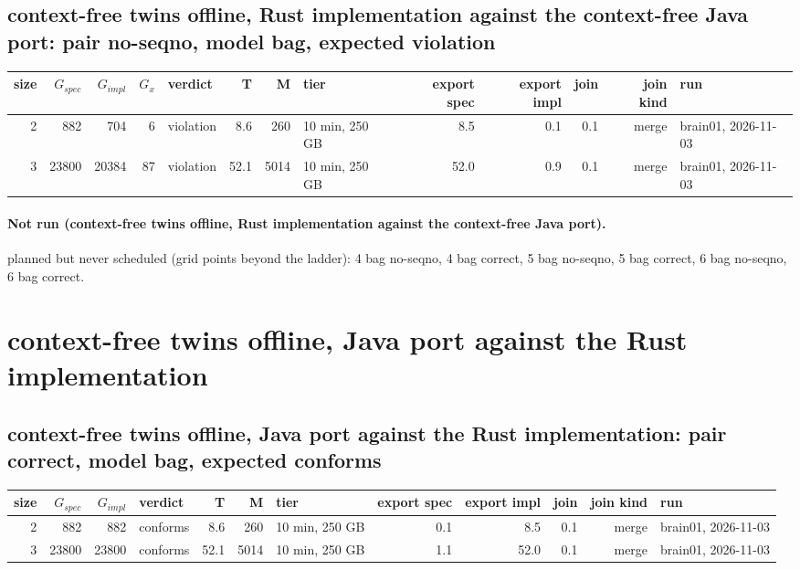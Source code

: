 \documentclass[10pt]{article}
\begin{document}
\subsection*{context-free twins offline, Rust implementation against the context-free Java port: pair \textsf{no-seqno}, model bag, expected violation}
\begin{longtable}{@{}rrrrlrrlrrrrl@{}}
\toprule
size & $G_{\mathit{spec}}$ & $G_{\mathit{impl}}$ & $G_x$ & verdict & T & M & tier & export spec & export impl & join & join kind & run \\
\midrule
\endhead
\color{blue} 2 & 882 & 704 & 6 & violation & 8.6 & 260 & 10 min, 250 GB & 8.5 & 0.1 & 0.1 & merge & brain01, 2026-11-03 \\
\color{blue} 3 & 23800 & 20384 & 87 & violation & 52.1 & 5014 & 10 min, 250 GB & 52.0 & 0.9 & 0.1 & merge & brain01, 2026-11-03 \\
\bottomrule
\end{longtable}
\paragraph{Not run (context-free twins offline, Rust implementation against the context-free Java port).}
planned but never scheduled (grid points beyond the ladder): 4 bag no-seqno, 4 bag correct, 5 bag no-seqno, 5 bag correct, 6 bag no-seqno, 6 bag correct.\par
\section*{context-free twins offline, Java port against the Rust implementation}
\subsection*{context-free twins offline, Java port against the Rust implementation: pair \textsf{correct}, model bag, expected conforms}
\begin{longtable}{@{}rrrlrrlrrrrl@{}}
\toprule
size & $G_{\mathit{spec}}$ & $G_{\mathit{impl}}$ & verdict & T & M & tier & export spec & export impl & join & join kind & run \\
\midrule
\endhead
\color{blue} 2 & 882 & 882 & conforms & 8.6 & 260 & 10 min, 250 GB & 0.1 & 8.5 & 0.1 & merge & brain01, 2026-11-03 \\
\color{blue} 3 & 23800 & 23800 & conforms & 52.1 & 5014 & 10 min, 250 GB & 1.1 & 52.0 & 0.1 & merge & brain01, 2026-11-03 \\
\bottomrule
\end{longtable}
\end{document}
